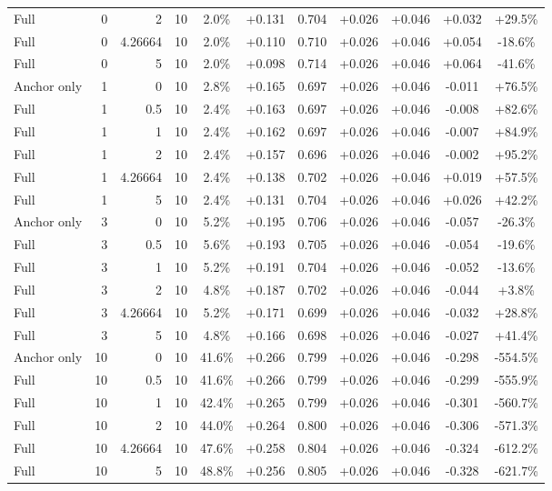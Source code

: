 \begin{table}[htbp]
\begin{tabular}{lrrrccccccc}
Full & 0 & 2 & 10 & 2.0\% & +0.131 & 0.704 & +0.026 & +0.046 & +0.032 & +29.5\% \\
Full & 0 & 4.26664 & 10 & 2.0\% & +0.110 & 0.710 & +0.026 & +0.046 & +0.054 & -18.6\% \\
Full & 0 & 5 & 10 & 2.0\% & +0.098 & 0.714 & +0.026 & +0.046 & +0.064 & -41.6\% \\
Anchor only & 1 & 0 & 10 & 2.8\% & +0.165 & 0.697 & +0.026 & +0.046 & -0.011 & +76.5\% \\
Full & 1 & 0.5 & 10 & 2.4\% & +0.163 & 0.697 & +0.026 & +0.046 & -0.008 & +82.6\% \\
Full & 1 & 1 & 10 & 2.4\% & +0.162 & 0.697 & +0.026 & +0.046 & -0.007 & +84.9\% \\
Full & 1 & 2 & 10 & 2.4\% & +0.157 & 0.696 & +0.026 & +0.046 & -0.002 & +95.2\% \\
Full & 1 & 4.26664 & 10 & 2.4\% & +0.138 & 0.702 & +0.026 & +0.046 & +0.019 & +57.5\% \\
Full & 1 & 5 & 10 & 2.4\% & +0.131 & 0.704 & +0.026 & +0.046 & +0.026 & +42.2\% \\
Anchor only & 3 & 0 & 10 & 5.2\% & +0.195 & 0.706 & +0.026 & +0.046 & -0.057 & -26.3\% \\
Full & 3 & 0.5 & 10 & 5.6\% & +0.193 & 0.705 & +0.026 & +0.046 & -0.054 & -19.6\% \\
Full & 3 & 1 & 10 & 5.2\% & +0.191 & 0.704 & +0.026 & +0.046 & -0.052 & -13.6\% \\
Full & 3 & 2 & 10 & 4.8\% & +0.187 & 0.702 & +0.026 & +0.046 & -0.044 & +3.8\% \\
Full & 3 & 4.26664 & 10 & 5.2\% & +0.171 & 0.699 & +0.026 & +0.046 & -0.032 & +28.8\% \\
Full & 3 & 5 & 10 & 4.8\% & +0.166 & 0.698 & +0.026 & +0.046 & -0.027 & +41.4\% \\
Anchor only & 10 & 0 & 10 & 41.6\% & +0.266 & 0.799 & +0.026 & +0.046 & -0.298 & -554.5\% \\
Full & 10 & 0.5 & 10 & 41.6\% & +0.266 & 0.799 & +0.026 & +0.046 & -0.299 & -555.9\% \\
Full & 10 & 1 & 10 & 42.4\% & +0.265 & 0.799 & +0.026 & +0.046 & -0.301 & -560.7\% \\
Full & 10 & 2 & 10 & 44.0\% & +0.264 & 0.800 & +0.026 & +0.046 & -0.306 & -571.3\% \\
Full & 10 & 4.26664 & 10 & 47.6\% & +0.258 & 0.804 & +0.026 & +0.046 & -0.324 & -612.2\% \\
Full & 10 & 5 & 10 & 48.8\% & +0.256 & 0.805 & +0.026 & +0.046 & -0.328 & -621.7\% \\

\end{tabular}
\end{table}
